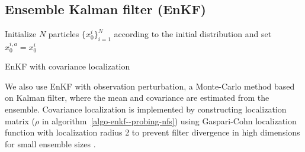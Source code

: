 \subsection{Ensemble Kalman filter (EnKF)} \label{ssec-enkf--probing-nfs}
\begin{algorithm}[!t]
Initialize $N$ particles $\{x_0^i\}_{i=1}^N$ according to the initial distribution and set $x_0^{i,a}=x_0^i$ \\
 \caption{EnKF with covariance localization}
\label{algo-enkf--probing-nfs} 
\end{algorithm}
We also use EnKF \cite{Evensen07} with observation perturbation, a Monte-Carlo method based on Kalman filter, where the mean and covariance are estimated from the ensemble. Covariance localization is implemented by constructing localization matrix ($\rho$ in algorithm~\ref{algo-enkf--probing-nfs}) using Gaspari-Cohn localization function with localization radius 2 to prevent filter divergence in high dimensions for small ensemble sizes \cite{farchi2018comparison}.
